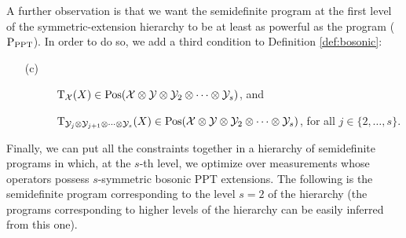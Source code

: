 A further observation is that we want the semidefinite program at the first level 
of the symmetric-extension hierarchy to be at least as powerful as the program 
($\textup{P}_{\mathrm{PPT}}$). In order to do so, we add a third condition to Definition 
\ref{def:bosonic}:
  \begin{itemize}
    \item[(c)] 
      \begin{description}
        \item[] $\operatorname{T}_{\mathcal{X}}(X) \in \mathrm{Pos}(\mathcal{X}\otimes\mathcal{Y}\otimes\mathcal{Y}_{2}\otimes\cdots\otimes\mathcal{Y}_{s})$, and
        \item[] $\operatorname{T}_{\mathcal{Y}_{j}\otimes\mathcal{Y}_{j+1}\otimes\cdots\otimes\mathcal{Y}_{s}}(X) \in 
      \mathrm{Pos}(\mathcal{X}\otimes\mathcal{Y}\otimes\mathcal{Y}_{2}\otimes\cdots\otimes\mathcal{Y}_{s})$, 
      for all $j \in \{2, \ldots, s\}$.
      \end{description}
  \end{itemize}

Finally, we can put all the constraints together in a hierarchy of semidefinite programs 
in which, at the $s$-th level, we optimize over measurements whose operators possess 
$s$-symmetric bosonic PPT extensions. 
The following is the semidefinite program corresponding to the level $s = 2$ of 
the hierarchy (the programs corresponding to higher levels of the hierarchy can 
be easily inferred from this one).

